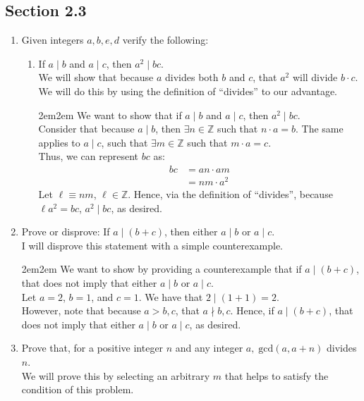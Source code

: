 \documentclass[10pt,oneside]{book}
\newcommand{\Z}{\mathbb{Z}}\newcommand{\R}{\mathbb{R}}\newcommand{\N}{\mathbb{N}}
\newcommand{\n}{\vspace{0.15cm}\\}
\newcommand{\en}{\vspace{0.25cm}\\}
\let\endoldproof\endproof
\renewenvironment{proof}[1][\proofname]
  {\vspace{0.2cm}\begin{adjustwidth}{2em}{2em}
   \oldproof[#1]}
  {\endoldproof
   \end{adjustwidth}}
\begin{document}
\subsection*{Section 2.3}
\begin{enumerate}
    \item[2.] Given integers $a, b, e, d$ verify the following:
    \begin{enumerate}
        \item[(b)] If $a \mid b$ and $a \mid c$, then $a^2 \mid bc$.\en
        We will show that because $a$ divides both $b$ and $c$, that $a^2$ will divide $b\cdot c$. We will do this by using the definition of ``divides'' to our advantage.
        \begin{proof}
            We want to show that if $a \mid b$ and $a \mid c$, then $a^2 \mid bc$. \n
            Consider that because $a\mid b$, then $\exists n\in \Z$ such that $n\cdot a = b$. The same applies to $a\mid c$, such that $\exists m\in\Z$ such that $m\cdot a = c$.\en
            Thus, we can represent $bc$ as:
            \begin{align*}
                bc &= an\cdot am\\
                &= nm\cdot a^2
            \end{align*}
            Let $\ell \equiv nm$, $\ell \in \Z$. Hence, via the definition of ``divides'', because $\ell a^2 = bc$, $a^2\mid bc$, as desired. 
        \end{proof}
    \end{enumerate}
    \item [3.]Prove or disprove: If $a \mid (b + c)$, then either $a \mid b $ or $a \mid c$.\en
    I will disprove this statement with a simple counterexample.
    \begin{proof}
        We want to show by providing a counterexample that if $a\mid (b+c)$, that does not imply that either $a\mid b$ or $a\mid c$. \en
        Let $a = 2$, $b = 1$, and $c = 1$. We have that $2\mid (1+1) = 2$. \en
        However, note that because $a > b,c$, that $a\nmid b, c$. Hence, if $a\mid (b+c)$, that does not imply that either $a\mid b$ or $a\mid c$, as desired.  
    \end{proof}
    \item [12.] Prove that, for a positive integer $n$ and any integer $a,\; \text{gcd}(a, a+ n)$ divides $n$.\n
    We will prove this by selecting an arbitrary $m$ that helps to satisfy the condition of this problem.

\end{enumerate}
\end{document}
